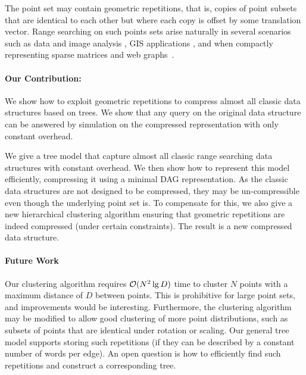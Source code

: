 The point set may contain geometric repetitions, that is, copies of point subsets that are identical to each other but where each copy is offset by some translation vector.
Range searching on such points sets arise naturally in several scenarios such as data and image analysis \cite{tetko2001pattern, pajarola2000image, dick2009a}, GIS applications \cite{schindler2008detecting, zhu2002efficient, haegler2010a, dick2009a}, and when compactly representing sparse matrices and web graphs~\cite{Galli98compressionof, brisaboa2009k2, brisaboaainterleaved, de2013compact}.

\paragraph{Our Contribution: } 
We show how to exploit geometric repetitions to compress almost all classic data structures based on trees. We show that any query on the original data structure can be answered by simulation on the compressed representation with only constant overhead. 

We give a tree model that capture almost all classic range searching data structures with constant overhead. We then show how to represent this model efficiently, compressing it using a minimal DAG representation.
As the classic data structures are not designed to be compressed, they may be un-compressible even though the underlying point set is. 
To compensate for this, we also give a new hierarchical clustering algorithm ensuring that geometric repetitions are indeed compressed (under certain constraints). The result is a new compressed data structure.

\paragraph{Future Work}
Our clustering algorithm requires $\mathcal{O}(N^2 \lg D)$ time to cluster $N$ points with a maximum distance of $D$ between points. This is prohibitive for large point sets, and improvements would be interesting. Furthermore, the clustering algorithm may be modified to allow good clustering of more point distributions, such as subsets of points that are identical under rotation or scaling. Our general tree model supports storing such repetitions (if they can be described by a constant number of words per edge). An open question is how to efficiently find such repetitions and construct a corresponding tree.


